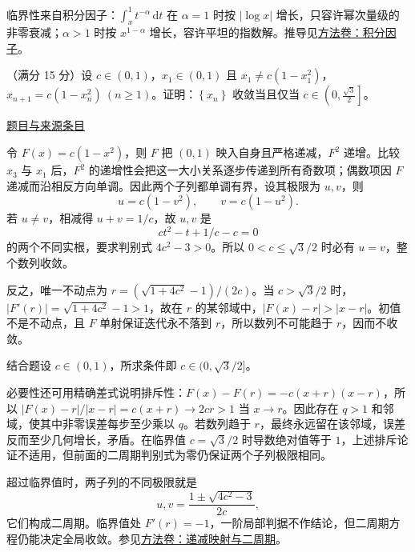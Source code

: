 \documentclass[UTF8,12pt,a4paper,fontset=fandol]{ctexart}
\begin{document}
\begin{remark}[方法与条件]临界性来自积分因子：$\int_x^1t^{-\alpha}\,\mathrm dt$ 在 $\alpha=1$ 时按 $|\log x|$ 增长，只容许幂次量级的非零衰减；$\alpha>1$ 时按 $x^{1-\alpha}$ 增长，容许平坦的指数解。推导见\hyperref[app:dynamics-factor]{方法卷：积分因子}。\end{remark}

\begin{example}\label{ex:fin10-lo:8}\label{pr:fin10-lo:8}

（满分 15 分）设 $c\in(0,1)$，$x_{1}\in(0,1)$ 且 $x_{1}\neq c\left(1-x_{1}^{2}\right)$，$x_{n+1}=c\left(1-x_{n}^{2}\right)\ (n\geq1)$。证明：$\left\{x_{n}\right\}$ 收敛当且仅当 $c\in\left(0,\frac{\sqrt{3}}{2}\right]$。

\par\href{https://github.com/lzxcr/cmc-mathematics/blob/64916fa1fdbc3e444a652eca204d5669058ee321/src/problems/finals/10/08.md}{题目与来源条目}

\end{example}

\begin{solve}\label{ans:fin10-lo:8}

令 $F(x)=c(1-x^2)$，则 $F$ 把 $(0,1)$ 映入自身且严格递减，$F^2$ 递增。比较 $x_3$ 与 $x_1$ 后，$F^2$ 的递增性会把这一大小关系逐步传递到所有奇数项；偶数项因 $F$ 递减而沿相反方向单调。因此两个子列都单调有界，设其极限为 $u,v$，则
\[
u=c(1-v^2),\qquad v=c(1-u^2).
\]
若 $u\ne v$，相减得 $u+v=1/c$，故 $u,v$ 是
\[
ct^2-t+1/c-c=0
\]
的两个不同实根，要求判别式 $4c^2-3>0$。所以 $0<c\leq\sqrt3/2$ 时必有 $u=v$，整个数列收敛。

反之，唯一不动点为 $r=(\sqrt{1+4c^2}-1)/(2c)$。当 $c>\sqrt3/2$ 时，$|F'(r)|=\sqrt{1+4c^2}-1>1$，故在 $r$ 的某邻域中，$|F(x)-r|>|x-r|$。初值不是不动点，且 $F$ 单射保证迭代永不落到 $r$，所以数列不可能趋于 $r$，因而不收敛。

结合题设 $c\in(0,1)$，所求条件即 $c\in(0,\sqrt3/2]$。

必要性还可用精确差式说明排斥性：$F(x)-F(r)=-c(x+r)(x-r)$，所以 $|F(x)-r|/|x-r|=c(x+r)\to2cr>1$ 当 $x\to r$。因此存在 $q>1$ 和邻域，使其中非零误差每步至少乘以 $q$。若数列趋于 $r$，最终永远留在该邻域，误差反而至少几何增长，矛盾。在临界值 $c=\sqrt3/2$ 时导数绝对值等于 $1$，上述排斥论证不适用，但前面的二周期判别式为零仍保证两个子列极限相同。

\end{solve}

\begin{remark}[方法与条件]超过临界值时，两子列的不同极限就是
\[
u,v=\frac{1\pm\sqrt{4c^2-3}}{2c},
\]
它们构成二周期。临界值处 $F'(r)=-1$，一阶局部判据不作结论，但二周期方程仍能决定全局收敛。参见\hyperref[app:dynamics-iteration]{方法卷：递减映射与二周期}。\end{remark}
\end{document}
